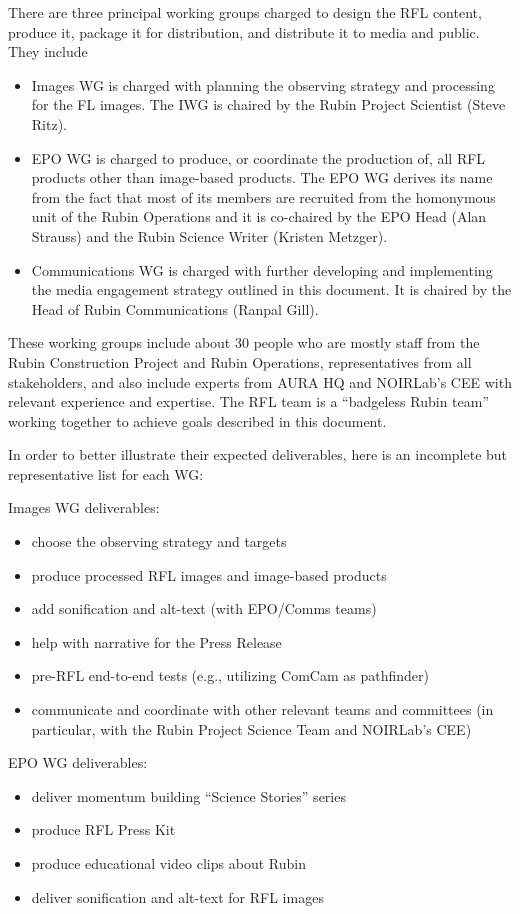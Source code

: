 There are three principal working groups charged to design the RFL content, produce it, package it for distribution,
and distribute it to media and public. They include
\begin{itemize}
\item Images WG is charged with planning the observing strategy and processing for the FL images. The IWG is
  chaired by the Rubin Project Scientist (Steve Ritz).
\item EPO WG is charged to produce, or coordinate the production of, all RFL products other than image-based
  products. The EPO WG derives its name from the fact that most of its members are recruited from the homonymous
  unit of the Rubin Operations and it is co-chaired by the EPO Head (Alan Strauss) and the Rubin Science Writer (Kristen Metzger). 
\item Communications WG is charged with further developing and implementing the media engagement strategy
         outlined in this document. It is chaired by the Head of Rubin Communications (Ranpal Gill). 
\end{itemize} 

These working groups include about 30 people who are mostly staff from the Rubin Construction Project and Rubin Operations,
representatives from all stakeholders, and also include experts from AURA HQ and NOIRLab’s CEE with relevant experience and
expertise. The RFL team is a ``badgeless Rubin team'' working together to achieve goals described in this document. 

In order to better illustrate their expected deliverables, here is an incomplete but representative
list for each WG: 

Images WG deliverables:
\begin{itemize}
\item choose the observing strategy and targets  
\item produce processed RFL images and image-based products 
\item add sonification and alt-text (with EPO/Comms teams)  
\item help with narrative for the Press Release 
\item pre-RFL end-to-end tests (e.g., utilizing ComCam as pathfinder) 
\item communicate and coordinate with other relevant teams and committees (in particular,
           with the Rubin Project Science Team and NOIRLab's CEE)
\end{itemize} 


EPO WG deliverables:
\begin{itemize}
\item deliver momentum building “Science Stories” series 
\item produce RFL Press Kit 
\item produce educational video clips about Rubin 
\item deliver sonification and alt-text for RFL images
\end{itemize} 


